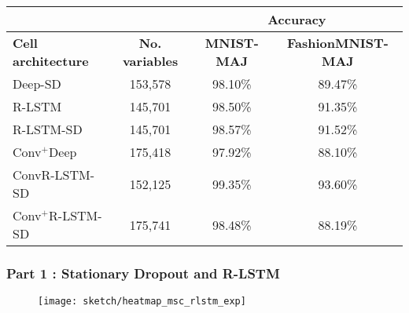 \renewcommand{\arraystretch}{1.5}
\begin{table}[h]
\begin{center}
\begin{tabular}{lc|c|c|}
\cline{3-4}
& &
\multicolumn{2}{c|}{\parbox{3.5cm}{ \vskip 1mm \centering \textbf{Accuracy} \vskip 1mm}} \\ \hline
\multicolumn{1}{|l|}{\textbf{Cell architecture}} & \textbf{No. variables} & \textbf{MNIST-MAJ} & \textbf{FashionMNIST-MAJ} \\ \hline
\multicolumn{1}{|l|}{Deep-SD}                  & 153,578             & 98.10\% & 89.47\% \\ 
\multicolumn{1}{|l|}{R-LSTM}                    & 145,701   & 98.50\% & 91.35\% \\ 
\multicolumn{1}{|l|}{R-LSTM-SD}              &  145,701                & 98.57\% & 91.52\% \\ 
 \multicolumn{1}{|l|}{Conv$^+$Deep}       & 175,418                 & 97.92\% & 88.10\% \\
 \multicolumn{1}{|l|}{ConvR-LSTM-SD}      & 152,125                 & 99.35\% & 93.60\%  \\ 
\multicolumn{1}{|l|}{Conv$^+$R-LSTM-SD}   & 175,741                & 98.48\% & 88.19\%  \\ \hline 
\end{tabular}

\end{center}

\label{tab:maj_exp3_model_acc}
\end{table}
\renewcommand{\arraystretch}{1}


\subsubsection{Part 1 : Stationary Dropout and R-LSTM}
 \begin{figure}[!htb]
\centering
\texttt{[image: sketch/heatmap\_msc\_rlstm\_exp]}
\label{fig:heatmap_msc_rlstm_exp}
\end{figure}

